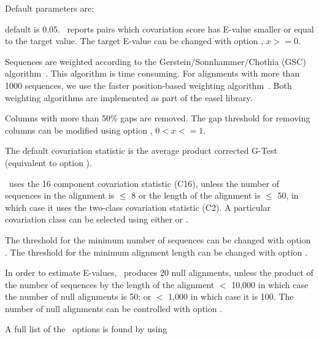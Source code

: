 Default parameters are:

\begin{sreitems}{}
\item[\emprog{Target E-value:}]default is 0.05. \rscape\, reports
  pairs which covariation score has E-value smaller or equal to the
  target value.  The target E-value can be changed with option
  , $x >= 0$.

\item[\emprog{Sequence weighting:}]Sequences are weighted according to
  the Gerstein/Sonnhammer/Chothia (GSC)
  algorithm~\citep{Gerstein94}. This algorithm is time consuming. For
  alignments with more than 1000 sequences, we use the faster
  position-based weighting algorithm~\citep{Henikoff94b}. Both
  weighting algorithms are implemented as part of the easel library.

\item[\emprog{Gaps in columns:}]Columns with more than 50\% gaps are
  removed. The gap threshold for removing columns can be modified
   using option  , $0<x<=1$.

 \item[\emprog{Covariation statistic:}]The default covariation statistic
   is the average product corrected G-Test (equivalent to option
   ).

 \item[\emprog{Covariation Class:}]\rscape\ uses the 16 component
   covariation statistic (C16), unless the number of sequences in the
   alignment is $\leq$ 8 or the length of the alignment is $\leq$ 50,
   in which case it uses the two-class covariation statistic (C2). A
   particular covariation class can be selected using either
    or .

   The threshold for the minimum number of sequences can be changed
   with option .  The threshold for the minimum
   alignment length can be changed with option .

 \item[\emprog{Null alignments:}]In order to estimate E-values,
   \rscape\ produces 20 null alignments, unless the product of the
   number of sequences by the length of the alignment $<$ 10,000 in
   which case the number of null alignments is 50; or $<$ 1,000 in
   which case it is 100. The number of null alignments can be
   controlled with option .
 \end{sreitems}

 A full list of the \rscape\ options is found by using


 
 
